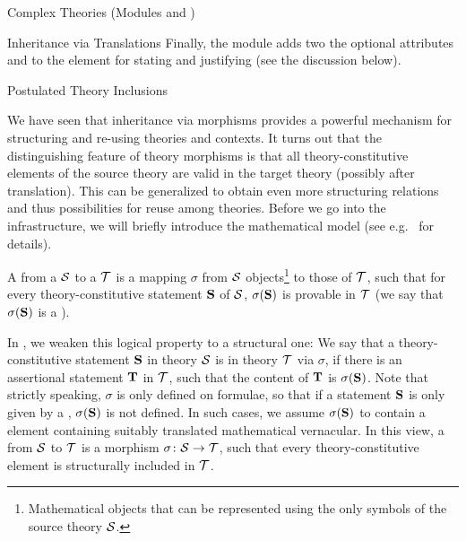 \begin{tchapter}[id=complex-theories,short=Complex Theories]{Complex Theories (Modules
    {} and {})}
\begin{tsection}[id=morphisms]{Inheritance via Translations}
Finally, the {} module adds two the optional attributes
{} and {} to
the {} element for stating and justifying {}
(see the discussion below).
\end{tsection}

\begin{tsection}[id=theory-inclusions]{Postulated Theory Inclusions}
  
  We have seen that inheritance via morphisms provides a powerful mechanism for
  structuring and re-using theories and contexts. It turns out that the distinguishing
  feature of theory morphisms is that all theory-constitutive elements of the source
  theory are valid in the target theory (possibly after translation). This can be
  generalized to obtain even more structuring relations and thus possibilities for reuse
  among theories. Before we go into the {\omdoc} infrastructure, we will briefly introduce
  the mathematical model (see e.g.~\cite{Hutter:mocsv00} for details).

  A {} from a {} ${\cal S}$ to a
  {} ${\cal T}$ is a mapping $\sigma$ from ${\cal S}$
  objects\footnote{Mathematical objects that can be represented using the only symbols of
    the source theory ${\cal S}$.} to those of ${\cal T}$, such that for every theory-constitutive
  statement ${\bf S}$ of ${\cal S}$, $\sigma({\bf S})$ is provable in ${\cal T}$ (we say that $\sigma({\bf S})$
  is a {}).
   
  In {\omdoc}, we weaken this logical property to a structural one: We say that a
  theory-constitutive statement ${\bf S}$ in theory ${\cal S}$ is
  {} in theory ${\cal T}$ via $\sigma$, if there is an
  assertional statement ${\bf T}$ in ${\cal T}$, such that the content
  of ${\bf T}$ is $\sigma({\bf S})$.  Note that strictly speaking, $\sigma$ is only defined on
  formulae, so that if a statement ${\bf S}$ is only given by a {}, $\sigma({\bf S})$
  is not defined. In such cases, we assume $\sigma({\bf S})$ to contain a {}
  element containing suitably translated mathematical vernacular. In this view, a
  {} from ${\cal S}$ to ${\cal T}$ is a morphism
  $\sigma\colon{\cal S}\to{\cal T}$, such that every theory-constitutive element is structurally
  included in ${\cal T}$.
  

\end{tsection}
\end{tchapter}

